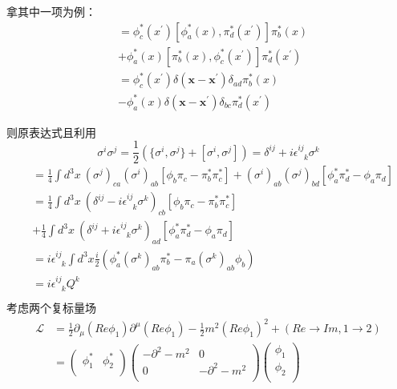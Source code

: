 \documentclass{article}
\begin{document}
拿其中一项为例：
\begin{align}
[\phi^{*}_{a}(x)\pi^{*}_{b}(x),\phi^{*}_{c}(x^{\prime})  \pi^{*}_{d}(x^{\prime})] 
	&= \phi^{*}_{c}(x^{\prime}) [\phi^{*}_{a}(x), \pi^{*}_{d}(x^{\prime})]\pi^{*}_{b}(x) \nonumber \\
	&+\phi^{*}_{a}(x)[\pi^{*}_{b}(x), \phi^{*}_{c}(x^{\prime})]\pi^{*}_{d}(x^{\prime}) \nonumber \\
	&= \phi^{*}_{c}(x^{\prime}) \delta(\mathbf{x} - \mathbf{x}^{\prime}) \delta_{ad} \pi^{*}_{b}(x) \nonumber \\
	&-\phi^{*}_{a}(x)\delta(\mathbf{x} - \mathbf{x}^{\prime}) \delta_{bc}\pi^{*}_{d}(x^{\prime}) \nonumber 
\end{align}

则原表达式且利用
$$\sigma^{i} \sigma^{j}=\frac{1}{2} ( \{ \sigma^{i},\sigma^{j} \} +[\sigma^{i},\sigma^{j}] ) = \delta^{ij} 
+ i \epsilon^{ij}_{\phantom{ij} k} \sigma^{k}$$
\begin{align}
[Q^{i},Q^{j}] 
&= \frac{1}{4} \int d^3 x \:
(\sigma^{j})_{ca} (\sigma^{i})_{ab} [\phi_{b} \pi_{c} - \pi^{*}_{b}\pi^{*}_{c}]
+  (\sigma^{i})_{ab} (\sigma^{j})_{bd}[ \phi^{*}_{a}\pi^{*}_{d}- \phi_{a} \pi_{d}]
\nonumber \\
&=\frac{1}{4} \int d^3 x \:
(\delta^{ij}-i \epsilon^{ij}_{\phantom{ij} k} \sigma^{k})_{cb} [\phi_{b} \pi_{c} - \pi^{*}_{b}\pi^{*}_{c}] \nonumber \\
&+\frac{1}{4} \int d^3 x \:
(\delta^{ij}+i \epsilon^{ij}_{\phantom{ij} k} \sigma^{k})_{ad} [\phi^{*}_{a}\pi^{*}_{d}- \phi_{a} \pi_{d}] \nonumber \\
&=i \epsilon^{ij}_{\phantom{ij} k} \int d^3 x  \frac{i}{2} \left( 
		\phi^{*}_{a} (\sigma^{k})_{ab} \pi^{*}_{b} - \pi_{a} (\sigma^{k})_{ab} \phi_{b} 								\right) \nonumber \\
&=i \epsilon^{ij}_{\phantom{ij} k} Q^{k} \nonumber \\
\end{align}
考虑两个复标量场
\begin{align}
\mathcal{L} &= \frac{1}{2} \partial_{\mu}(Re \phi_1) \partial^{\mu}(Re \phi_1) - \frac{1}{2} m^2 (Re \phi_1)^2 + (Re \rightarrow Im, 1 \rightarrow 2 ) \nonumber \\
&= \left(
	\begin{matrix}
		\phi_1^{*} & \phi_2^{*} \\
	\end{matrix} 
\right)
\left(
	\begin{matrix}
		-\partial^2 - m^2 & 0 \\
		0 & -\partial^2 - m^2 \\
	\end{matrix} 
\right)
\left(
	\begin{matrix}
		\phi_1 \\
		\phi_2\\
	\end{matrix} 
\right)
\end{align}
\end{document}
